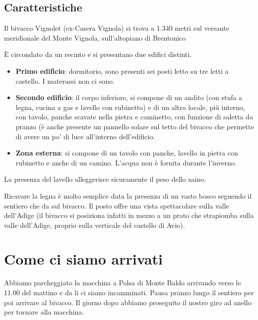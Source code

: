 \documentclass{article}
\begin{document}
\subsection{Caratteristiche}
Il bivacco Vignolet (ex-Casera Vignola) si trova a 1.340 metri sul versante meridionale del Monte Vignola, sull'altopiano di Brentonico

È circondato da un recinto e si presentano due edifici distinti.
\begin{itemize}
    \item \textbf{Primo edificio}: dormitorio, sono presenti sei posti letto su tre letti a castello. I materassi non ci sono.
    \item \textbf{Secondo edificio}: il corpo inferiore, si compone di un andito (con stufa a legna, cucina a gas e lavello con rubinetto) e di un altro locale, più interno, con tavolo, panche scavate nella pietra e caminetto, con funzione di saletta da pranzo (è anche presente un pannello solare sul tetto del bivacco che permette di avere un po' di luce all'interno dell'edificio.
    \item \textbf{Zona esterna}: si compone di un tavolo con panche, lavello in pietra con rubinetto e anche di un camino. L'acqua non è fornita durante l'inverno.
\end{itemize}

La presenza del lavello alleggerisce sicuramente il peso dello zaino.

Ricavare la legna è molto semplice data la presenza di un vasto bosco seguendo il sentiero che da sul bivacco. Il posto offre una vista spettacolare sulla valle dell'Adige (il bivacco si posiziona infatti in mezzo a un prato che strapiomba sulla valle dell'Adige, proprio sulla verticale del castello di Avio).

\section{Come ci siamo arrivati}
Abbiamo parcheggiato la macchina a Polsa di Monte Baldo arrivando verso le 11.00 del mattino e da li ci siamo incamminati. Pausa pranzo lungo il sentiero per poi arrivare al bivacco. Il giorno dopo abbiamo proseguito il nostro giro ad anello per tornare alla macchina.
\end{document}
